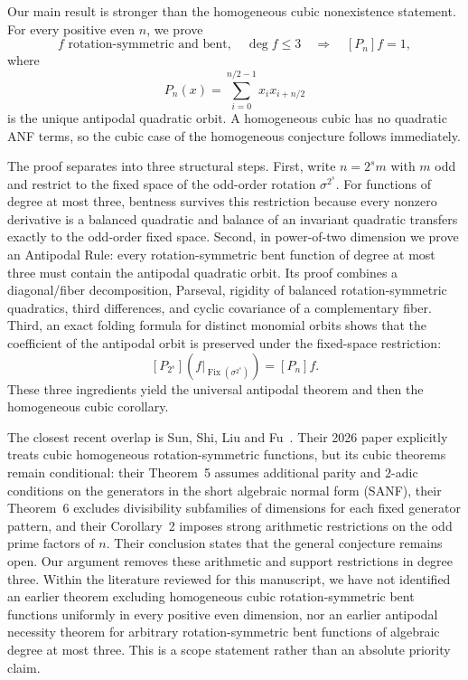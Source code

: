 \documentclass[11pt,a4paper]{article}
\theoremstyle{remark}
\theoremstyle{plain}
\newcommand{\Fix}{\operatorname{Fix}}
\begin{document}
Our main result is stronger than the homogeneous cubic nonexistence statement. For every positive even $n$, we prove
\[
\boxed{
f\text{ rotation-symmetric and bent},\quad \deg f\le3
\quad\Longrightarrow\quad
[P_n]f=1,
}
\]
where
\[
P_n(x)=\sum_{i=0}^{n/2-1}x_i x_{i+n/2}
\]
is the unique antipodal quadratic orbit. A homogeneous cubic has no quadratic ANF terms, so the cubic case of the homogeneous conjecture follows immediately.

The proof separates into three structural steps. First, write $n=2^s m$ with $m$ odd and restrict to the fixed space of the odd-order rotation $\sigma^{2^s}$. For functions of degree at most three, bentness survives this restriction because every nonzero derivative is a balanced quadratic and balance of an invariant quadratic transfers exactly to the odd-order fixed space. Second, in power-of-two dimension we prove an Antipodal Rule: every rotation-symmetric bent function of degree at most three must contain the antipodal quadratic orbit. Its proof combines a diagonal/fiber decomposition, Parseval, rigidity of balanced rotation-symmetric quadratics, third differences, and cyclic covariance of a complementary fiber. Third, an exact folding formula for distinct monomial orbits shows that the coefficient of the antipodal orbit is preserved under the fixed-space restriction:
\[
[P_{2^s}](f|_{\Fix(\sigma^{2^s})})=[P_n]f.
\]
These three ingredients yield the universal antipodal theorem and then the homogeneous cubic corollary.

The closest recent overlap is Sun, Shi, Liu and Fu~\cite{sun}. Their 2026 paper explicitly treats cubic homogeneous rotation-symmetric functions, but its cubic theorems remain conditional: their Theorem~5 assumes additional parity and $2$-adic conditions on the generators in the short algebraic normal form (SANF), their Theorem~6 excludes divisibility subfamilies of dimensions for each fixed generator pattern, and their Corollary~2 imposes strong arithmetic restrictions on the odd prime factors of $n$. Their conclusion states that the general conjecture remains open. Our argument removes these arithmetic and support restrictions in degree three. Within the literature reviewed for this manuscript, we have not identified an earlier theorem excluding homogeneous cubic rotation-symmetric bent functions uniformly in every positive even dimension, nor an earlier antipodal necessity theorem for arbitrary rotation-symmetric bent functions of algebraic degree at most three. This is a scope statement rather than an absolute priority claim.
\end{document}
